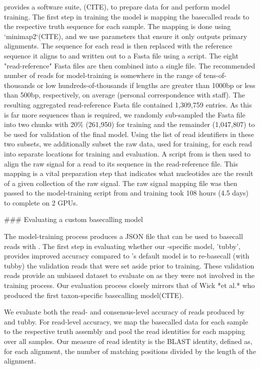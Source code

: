 \begin{markdown}
\ont{} provides a software suite, \taiyaki{}(CITE), to prepare data for and perform model training. The first step in training the model is mapping the \ont{} basecalled reads to the respective truth sequence for each sample. The mapping is done using `minimap2`(CITE), and we use parameters that ensure it only outputs primary alignments. The sequence for each read is then replaced with the reference sequence it aligns to and written out to a Fasta file using a \taiyaki{} script. The eight "read-reference" Fasta files are then combined into a single file. The recommended number of reads for model-training is somewhere in the range of tens-of-thousands or low hundreds-of-thousands if lengths are greater than 1000bp or less than 500bp, respectively, on average (personal correspondence with \ont{} staff). The resulting aggregated read-reference Fasta file contained 1,309,759 entries. As this is far more sequences than is required, we randomly sub-sampled the Fasta file into two chunks with 20\% (261,950) for training and the remainder (1,047,807) to be used for validation of the final model. Using the list of read identifiers in these two subsets, we additionally subset the raw data, used for training, for each read into separate locations for training and evaluation. A script from \taiyaki{} is then used to align the raw signal for a read to its sequence in the read-reference file. This mapping is a vital preparation step that indicates what nucleotides are the result of a given collection of the raw signal. The raw signal mapping file was then passed to the model-training script from \taiyaki{} and training took 108 hours (4.5 days) to complete on 2 GPUs.


### Evaluating a custom \ont{} basecalling model

The model-training process produces a JSON file that can be used to basecall \ont{} reads with \guppy{}. The first step in evaluating whether our \mtb{}-specific model, 'tubby', provides improved accuracy compared to \guppy{}'s default model is to re-basecall (with tubby) the validation reads that were set aside prior to training. These validation reads provide an unbiased dataset to evaluate on as they were not involved in the training process. Our evaluation process closely mirrors that of Wick *et al.* who produced the first taxon-specific \ont{} basecalling model(CITE).  

We evaluate both the read- and consensus-level accuracy of reads produced by \guppy{} and tubby. For read-level accuracy, we map the basecalled data for each sample to the respective truth assembly and pool the read identities for each mapping over all samples. Our measure of read identity is the BLAST identity, defined as, for each alignment, the number of matching positions divided by the length of the alignment.  


\end{markdown}
